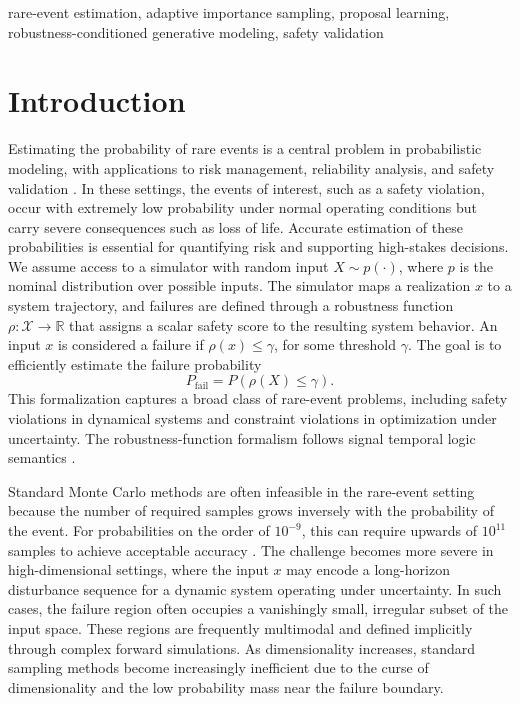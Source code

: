 \documentclass[twoside,11pt]{article}
\begin{document}
\begin{keywords}
rare-event estimation, adaptive importance sampling, proposal learning, robustness-conditioned generative modeling, safety validation
\end{keywords}


\section{Introduction}

Estimating the probability of rare events is a central problem in probabilistic modeling, with applications to risk management, reliability analysis, and safety validation \citep{corso2020survey, melchers2018structural, komljenovic2016assetrisk}. In these settings, the events of interest, such as a safety violation, occur with extremely low probability under normal operating conditions but carry severe consequences such as loss of life. Accurate estimation of these probabilities is essential for quantifying risk and supporting high-stakes decisions. We assume access to a simulator with random input $X \sim p(\cdot)$, where $p$ is the nominal distribution over possible inputs. The simulator maps a realization $x$ to a system trajectory, and failures are defined through a robustness function $\rho : \mathcal{X} \to \mathbb{R}$ that assigns a scalar safety score to the resulting system behavior. An input $x$ is considered a failure if $\rho(x) \leq \gamma$, for some threshold $\gamma$. The goal is to efficiently estimate the failure probability
\begin{equation*}
    P_{\text{fail}} = P(\rho(X) \leq \gamma).
\end{equation*}
This formalization captures a broad class of rare-event problems, including safety violations in dynamical systems and constraint violations in optimization under uncertainty. The robustness-function formalism follows signal temporal logic semantics \citep{fainekos2009robustness, donze2010robust}.

Standard Monte Carlo methods are often infeasible in the rare-event setting because the number of required samples grows inversely with the probability of the event. For probabilities on the order of $10^{-9}$, this can require upwards of $10^{11}$ samples to achieve acceptable accuracy \citep{owen2013monte}. The challenge becomes more severe in high-dimensional settings, where the input $x$ may encode a long-horizon disturbance sequence for a dynamic system operating under uncertainty. In such cases, the failure region often occupies a vanishingly small, irregular subset of the input space. These regions are frequently multimodal and defined implicitly through complex forward simulations. As dimensionality increases, standard sampling methods become increasingly inefficient due to the curse of dimensionality and the low probability mass near the failure boundary.
\end{document}
